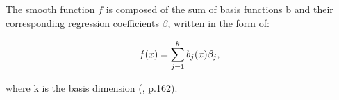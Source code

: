 The smooth function $f$ is composed of the sum of basis functions b and their corresponding regression coefficients $\beta$, written in the form of:

\begin{equation}  \label{eq:4} 
f(x) = \sum\limits_{j=1}^k b_{j}(x) \beta_{j}, \\
\end{equation}

where k is the basis dimension (\citet{Wood_2017}, p.162). 






